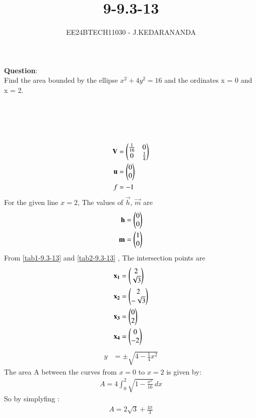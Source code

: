\documentclass[journal]{IEEEtran}
\numberwithin{equation}{enumi}
\numberwithin{figure}{enumi}
\begin{document}

\title{9-9.3-13}
\author{EE24BTECH11030 - J.KEDARANANDA}
{\let\newpage\relax\maketitle}
\textbf{Question}:\\
Find the area bounded by the ellipse $x^2 + 4y^2 = 16$ and the ordinates x = 0 and x = 2.
\\
\solution \\
\begin{table}[h!]    
  \centering
  
  \caption{}
  \label{tab1-9.3-13}
\end{table}\\
\begin{table}[h!]    
  \centering
  
  \caption{}
  \label{tab2-9.3-13}
\end{table}\\
\begin{align}
\mathbf{V}&=\begin{pmatrix}\frac{1}{16} & 0\\0 & \frac{1}{4}\end{pmatrix}\\
\mathbf{u}&=\begin{pmatrix}0\\0\end{pmatrix}\\
f&=-1
\end{align}
For the given line $x=2$, The values of $\vec{h}$, $\vec{m}$ are
\begin{align}
\mathbf{h}&=\begin{pmatrix}0\\0\end{pmatrix}\\
\mathbf{m}&=\begin{pmatrix}1\\0\end{pmatrix}
\end{align}
From \ref{tab1-9.3-13} and \ref{tab2-9.3-13} , The intersection points are
\begin{align}
\mathbf{x_1} &= \begin{pmatrix}2\\\sqrt{3}\end{pmatrix}\\
\mathbf{x_2} &= \begin{pmatrix}2\\-\sqrt{3}\end{pmatrix}\\
\mathbf{x_3} &= \begin{pmatrix}0\\2\end{pmatrix}\\
\mathbf{x_4} &= \begin{pmatrix}0\\-2\end{pmatrix}
\end{align}
\begin{align}
y &= \pm \sqrt{4 - \frac{1}{4}x^2}
\end{align}
The area A  between the curves from \( x = 0 \) to \( x = 2 \) is given by:
\begin{align}
A = 4 \int_0^2 \sqrt{1 - \frac{x^2}{16}} \, dx
\end{align}
So by simplyfing :
\begin{align}
A = 2\sqrt{3} + \frac{4\pi}{3}
\end{align}
\end{document}
